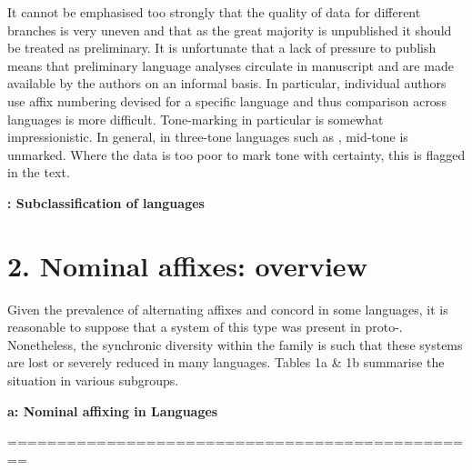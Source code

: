 \documentclass[output=paper]{langsci/langscibook}
\begin{document}
It cannot be emphasised too strongly that the quality of data for different branches is very uneven and that as the great majority is unpublished it should be treated as preliminary. It is unfortunate that a lack of pressure to publish means that preliminary language analyses circulate in manuscript and are made available by the authors on an informal basis. In particular, individual authors use affix numbering devised for a specific language and thus comparison across languages is more difficult. Tone-marking in particular is somewhat impressionistic. In general, in three-tone languages such as , mid-tone is unmarked. Where the data is too poor to mark tone with certainty, this is flagged in the text.

  
 

\textbf{: Subclassification of  languages} 

\section{2. Nominal affixes: overview}

Given the prevalence of alternating affixes and concord in some  languages, it is reasonable to suppose that a system of this type was present in proto-. Nonetheless, the synchronic diversity within the family is such that these systems are lost or severely reduced in many languages. Tables 1a \& 1b summarise the situation in various  subgroups.


\textbf{{a: Nominal affixing in  Languages}}


================================================
\end{document}
